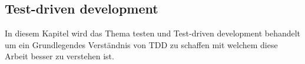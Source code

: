 \subsection{Test-driven development}\label{einleitung:tdd}

In diesem Kapitel wird das Thema testen und Test-driven development behandelt
um ein Grundlegendes Verständnis von TDD zu schaffen mit welchem diese Arbeit
besser zu verstehen ist.
